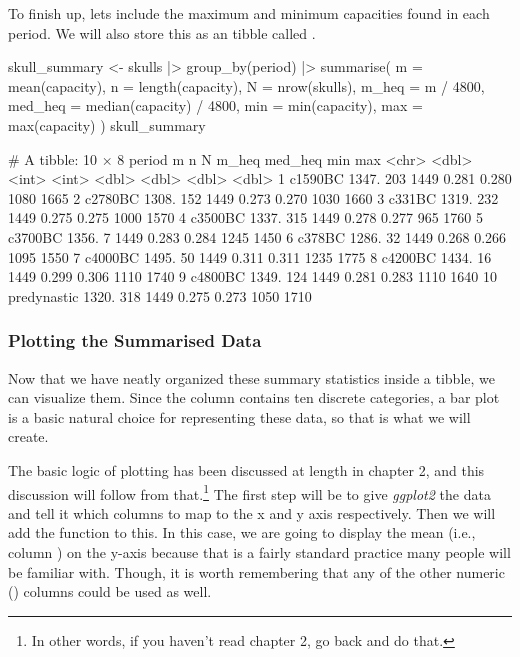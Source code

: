 To finish up, lets include the maximum and minimum capacities found in each period. We will also store this as an tibble called .

\begin{inR}
skull_summary <- skulls |>
  group_by(period) |>
  summarise(
    m = mean(capacity),
    n = length(capacity),
    N = nrow(skulls),
    m_heq = m / 4800,
    med_heq = median(capacity) / 4800,
    min = min(capacity),
    max = max(capacity)
  )
skull_summary
\end{inR}

\clearpage

\begin{outR}
# A tibble: 10 × 8
   period          m     n     N m_heq med_heq   min   max
   <chr>       <dbl> <int> <int> <dbl>   <dbl> <dbl> <dbl>
 1 c1590BC     1347.   203  1449 0.281   0.280  1080  1665
 2 c2780BC     1308.   152  1449 0.273   0.270  1030  1660
 3 c331BC      1319.   232  1449 0.275   0.275  1000  1570
 4 c3500BC     1337.   315  1449 0.278   0.277   965  1760
 5 c3700BC     1356.     7  1449 0.283   0.284  1245  1450
 6 c378BC      1286.    32  1449 0.268   0.266  1095  1550
 7 c4000BC     1495.    50  1449 0.311   0.311  1235  1775
 8 c4200BC     1434.    16  1449 0.299   0.306  1110  1740
 9 c4800BC     1349.   124  1449 0.281   0.283  1110  1640
10 predynastic 1320.   318  1449 0.275   0.273  1050  1710
\end{outR}

\subsubsection{Plotting the Summarised Data}

Now that we have neatly organized these summary statistics inside a tibble, we can visualize them. Since the  column contains ten discrete categories, a bar plot is a basic natural choice for representing these data, so that is what we will create.

The basic logic of plotting has been discussed at length in chapter 2, and this discussion will follow from that.\footnote{In other words, if you haven't read chapter 2, go back and do that.} The first step will be to give \textit{ggplot2} the data and tell it which columns to map to the x and y axis respectively. Then we will add the  function to this. In this case, we are going to display the mean (i.e., column ) on the y-axis because that is a fairly standard practice many people will be familiar with. Though, it is worth remembering that any of the other numeric () columns could be used as well.

